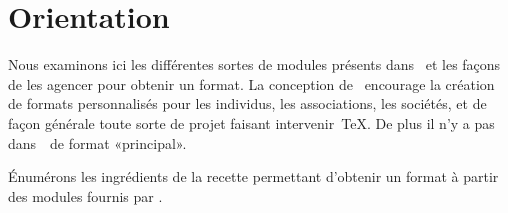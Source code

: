 

%
%
%
%


\section{Orientation}

Nous examinons ici les différentes sortes de modules présents dans
\brTeX\ et les façons de les agencer pour obtenir un format. La
conception de \brTeX\ encourage la création de formats personnalisés
pour les individus, les associations, les sociétés, et de façon
générale toute sorte de projet faisant intervenir~\TeX. De plus il n'y
a pas dans~\brTeX\ de format «principal».

Énumérons les ingrédients de la recette permettant d'obtenir un format à
partir des modules fournis par \brTeX.

